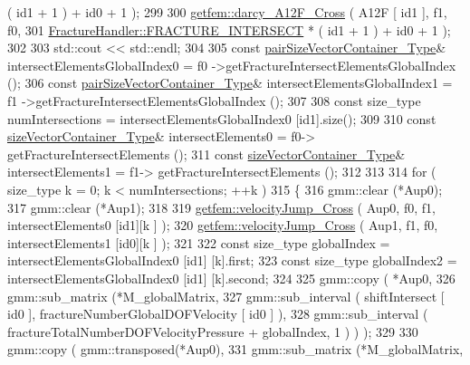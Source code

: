 \begin{DoxyCode}
       ( id1 + 1 ) + id0 + 1 );
299 
300         \hyperlink{namespacegetfem_a88df6c0cb0765d5ab0fae27679cd30f4}{getfem::darcy\_A12F\_Cross} ( A12F [ id1 ], f1, f0,
301                                    \hyperlink{classFractureHandler_a495ad4fc72d0c47c8f0424842f1153aaa781cae3f3b99bf9357fed2833d315537}{FractureHandler::FRACTURE\_INTERSECT} *
       ( id1 + 1 ) + id0 + 1 );
302 
303         std::cout << std::endl;
304         
305         \textcolor{keyword}{const} \hyperlink{Core_8h_a9bc476e433f99b82a9c2b8560735c7b5}{pairSizeVectorContainer\_Type}& intersectElementsGlobalIndex0 = f0
      ->getFractureIntersectElementsGlobalIndex ();
306         \textcolor{keyword}{const} \hyperlink{Core_8h_a9bc476e433f99b82a9c2b8560735c7b5}{pairSizeVectorContainer\_Type}& intersectElementsGlobalIndex1 = f1
      ->getFractureIntersectElementsGlobalIndex ();
307         
308         \textcolor{keyword}{const} size\_type numIntersections = intersectElementsGlobalIndex0 [id1].size();
309         
310         \textcolor{keyword}{const} \hyperlink{Core_8h_a80e8381d86ecb0a7f4f87ff84d1a0be5}{sizeVectorContainer\_Type}& intersectElements0 = f0->
      getFractureIntersectElements ();
311         \textcolor{keyword}{const} \hyperlink{Core_8h_a80e8381d86ecb0a7f4f87ff84d1a0be5}{sizeVectorContainer\_Type}& intersectElements1 = f1->
      getFractureIntersectElements ();
312         
313         
314         \textcolor{keywordflow}{for} ( size\_type k = 0; k < numIntersections; ++k )
315         \{
316             gmm::clear (*Aup0);
317             gmm::clear (*Aup1);
318 
319             \hyperlink{namespacegetfem_acc74b86734c3814042e614d015f23876}{getfem::velocityJump\_Cross} ( Aup0, f0, f1, intersectElements0 [id1][k
      ] );
320             \hyperlink{namespacegetfem_acc74b86734c3814042e614d015f23876}{getfem::velocityJump\_Cross} ( Aup1, f1, f0, intersectElements1 [id0][k
      ] );
321 
322             \textcolor{keyword}{const} size\_type globalIndex = intersectElementsGlobalIndex0 [id1] [k].first;
323             \textcolor{keyword}{const} size\_type globalIndex2 = intersectElementsGlobalIndex0 [id1] [k].second;
324             
325             gmm::copy ( *Aup0, 
326                         gmm::sub\_matrix (*M\_globalMatrix,
327                                         gmm::sub\_interval ( shiftIntersect [ id0 ], 
      fractureNumberGlobalDOFVelocity [ id0 ] ),
328                                         gmm::sub\_interval (  fractureTotalNumberDOFVelocityPressure + 
      globalIndex, 1 ) ) );
329 
330             gmm::copy ( gmm::transposed(*Aup0), 
331                         gmm::sub\_matrix (*M\_globalMatrix,

\end{DoxyCode}
